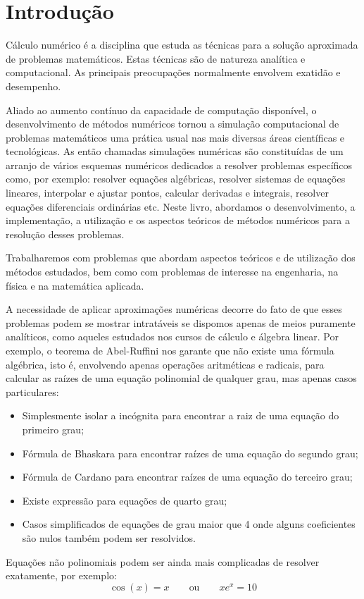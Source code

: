
%

\chapter{Introdução}

Cálculo numérico é a disciplina que estuda as técnicas para a solução aproximada de problemas matemáticos. Estas técnicas são de natureza analítica e computacional. As principais preocupações normalmente envolvem exatidão e desempenho.

Aliado ao aumento contínuo da capacidade de computação disponível, o desenvolvimento de métodos numéricos tornou a simulação computacional de problemas matemáticos uma prática usual nas mais diversas áreas científicas e tecnológicas. As então chamadas simulações numéricas são constituídas de um arranjo de vários esquemas numéricos dedicados a resolver problemas específicos como, por exemplo: resolver equações algébricas, resolver sistemas de equações lineares, interpolar e ajustar pontos, calcular derivadas e integrais, resolver equações diferenciais ordinárias etc. Neste livro, abordamos o desenvolvimento, a implementação, a utilização e os aspectos teóricos de métodos numéricos para a resolução desses problemas.

Trabalharemos com problemas que abordam aspectos teóricos e de utilização dos métodos estudados, bem como com problemas de interesse na engenharia, na física e na matemática aplicada.

A necessidade de aplicar aproximações numéricas decorre do fato de que esses problemas podem se mostrar intratáveis se dispomos apenas de meios puramente analíticos, como aqueles estudados nos cursos de cálculo e álgebra linear. Por exemplo, o teorema de Abel-Ruffini nos garante que não existe uma fórmula algébrica, isto é, envolvendo apenas operações aritméticas e radicais, para calcular as raízes de uma equação polinomial de qualquer grau, mas apenas casos particulares:
\begin{itemize}
\item Simplesmente isolar a incógnita para encontrar a raiz de uma equação do primeiro grau;
\item Fórmula de Bhaskara para encontrar raízes de uma equação do segundo grau;
\item Fórmula de Cardano para encontrar raízes de uma equação do terceiro grau;
\item Existe expressão para equações de quarto grau;
\item Casos simplificados de equações de grau maior que 4 onde alguns coeficientes são nulos também podem ser resolvidos.
\end{itemize}
Equações não polinomiais podem ser ainda mais complicadas de resolver exatamente, por exemplo:
$$
\cos(x)=x\qquad \text{ou}\qquad xe^x= 10
$$

